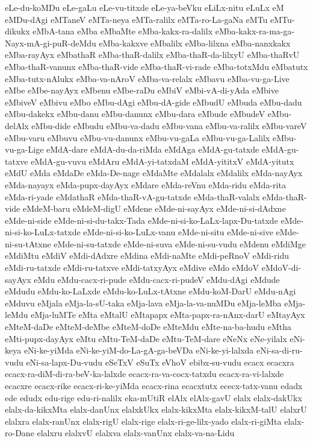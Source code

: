 {eLe-du-koMDu
eLe-gaLu
eLe-vu-titxde
eLe-ya-beVku
eLiLx-nitu
eLuLx
eM
eMDu-dAgi
eMTaneV
eMTa-neya
eMTa-ralilx
eMTa-ro-La-gaNa
eMTu
eMTu-dikukx
eMbA-tana
eMba
eMbaMte
eMba-kakx-ra-dalilx
eMba-kakx-ra-ma-ga-Nayx-mA-gi-puR-deMdu
eMba-kakxve
eMbalilx
eMba-lilxna
eMba-nanxkakx
eMba-rayAyx
eMbathaR
eMba-thaR-dalilx
eMba-thaR-da-lilxyU
eMba-thaRvU
eMba-thaR-vanunx
eMba-thaR-vide
eMba-thaR-vi-rade
eMba-totxMdu
eMbatutx
eMba-tutx-nAlukx
eMba-va-nAroV
eMba-va-relalx
eMbavu
eMba-vu-ga-Live
eMbe
eMbe-nayAyx
eMbenu
eMbe-raDu
eMbiV
eMbi-vA-di-yAda
eMbive
eMbiveV
eMbivu
eMbo
eMbu-dAgi
eMbu-dA-gide
eMbudU
eMbuda
eMbu-dadu
eMbu-dakekx
eMbu-danu
eMbu-danunx
eMbu-dara
eMbude
eMbudeV
eMbu-delAlx
eMbu-dide
eMbudu
eMbu-va-dadu
eMbu-vana
eMbu-va-ralilx
eMbu-vareV
eMbu-varu
eMbuvu
eMbu-vu-danunx
eMbu-vu-gaLa
eMbu-vu-ga-Lalilx
eMbu-vu-ga-Lige
eMdA-dare
eMdA-du-da-riMda
eMdAga
eMdA-gu-tatxde
eMdA-gu-tatxve
eMdA-gu-vuvu
eMdAru
eMdA-yi-tatxdaM
eMdA-yititxV
eMdA-yitutx
eMdU
eMda
eMdaDe
eMda-De-nage
eMdaMte
eMdalalx
eMdalilx
eMda-nayAyx
eMda-nayayx
eMda-pupx-dayAyx
eMdare
eMda-reVnu
eMda-ridu
eMda-rita
eMda-ri-yade
eMdathaR
eMda-thaR-vA-gu-tatxde
eMda-thaR-valalx
eMda-thaR-vide
eMdeM-baru
eMdeM-digU
eMdene
eMde-ni-sayAyx
eMde-ni-si-dAdxne
eMde-ni-side
eMde-ni-si-du-takx-Tada
eMde-ni-si-ko-LaLx-lapx-Du-tatxde
eMde-ni-si-ko-LuLx-tatxde
eMde-ni-si-ko-LuLx-vanu
eMde-ni-situ
eMde-ni-sive
eMde-ni-su-tAtxne
eMde-ni-su-tatxde
eMde-ni-suva
eMde-ni-su-vudu
eMdenu
eMdiMge
eMdiMtu
eMdiV
eMdi-dAdxre
eMdina
eMdi-naMte
eMdi-peRnoV
eMdi-ridu
eMdi-ru-tatxde
eMdi-ru-tatxve
eMdi-tatxyAyx
eMdive
eMdo
eMdoV
eMdoV-di-sayAyx
eMdu
eMdu-cacx-ri-pude
eMdu-cacx-ri-pudeV
eMdu-dAgi
eMdude
eMdudu
eMdu-ko-LaLxde
eMdu-ko-LuLx-tAtxne
eMdu-koM-DarU
eMdu-nAgi
eMduvu
eMjala
eMja-la-sU-taka
eMja-lava
eMja-la-va-nuMDu
eMja-leMba
eMja-leMdu
eMja-luMTe
eMta
eMtalU
eMtapapx
eMta-papx-ra-nAnx-darU
eMtayAyx
eMteM-daDe
eMteM-deMbe
eMteM-doDe
eMteMdu
eMte-na-ba-hudu
eMtha
eMti-pupx-dayAyx
eMtu
eMtu-TeM-daDe
eMtu-TeM-dare
eNeNx
eNe-yilalx
eNi-keya
eNi-ke-yiMda
eNi-ke-yiM-do-La-gA-ga-beVDa
eNi-ke-yi-lalxda
eNi-sa-di-ru-vudu
eNi-sa-lapx-Du-vudu
eSeTxV
eSuTx
eVhoV
ebibx-su-vudu
ecacx
ecacxra
ecacx-ra-diM-di-ra-beV-ka-lalxde
ecacx-ra-va-cocx-tatxdu
ecacx-ra-vi-lalxde
ecacxre
ecacx-rike
ecacx-ri-ke-yiMda
ecacx-rina
ecacxtutx
ececx-tatx-vanu
edadx
ede
edudx
edu-rige
edu-ri-nalilx
eka-mUtiR
elAlx
elAlx-gavU
elalx
elalx-dakUkx
elalx-da-kikxMta
elalx-danUnx
elalxkUkx
elalx-kikxMta
elalx-kikxM-talU
elalxrU
elalxra
elalx-ranUnx
elalx-rigU
elalx-rige
elalx-ri-ge-lilx-yado
elalx-ri-giMta
elalx-ro-Dane
elalxru
elalxvU
elalxva
elalx-vanUnx
elalx-va-na-Lidu
}
